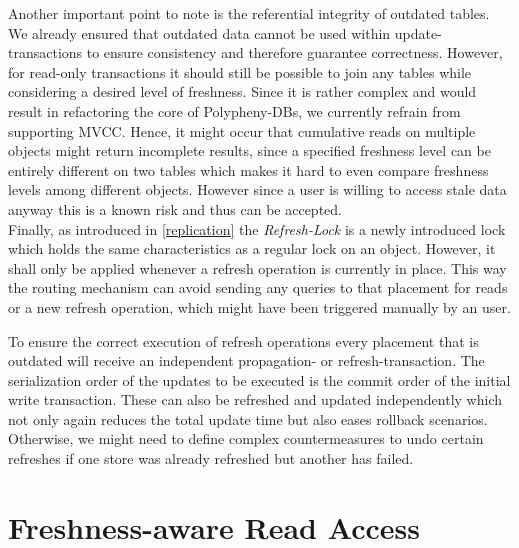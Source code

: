 Another important point to note is the referential integrity of outdated tables. We already ensured that outdated data cannot be used within update-transactions to 
ensure consistency and therefore guarantee correctness. However, for read-only transactions it should still be possible to join any tables while considering 
a desired level of freshness. 
Since it is rather complex and would result in refactoring the core of Polypheny-DBs, we currently refrain from supporting MVCC.
Hence, it might occur that cumulative reads on multiple objects might return incomplete results, since a specified freshness
level can be entirely different on two tables which makes it hard to even compare freshness levels among different objects. However since a user is willing to access 
stale data anyway this is a known risk and thus can be accepted.\\

Finally, as introduced in \ref{replication} the \emph{Refresh-Lock} is a newly introduced lock which holds the same characteristics as a regular lock on an object.
However, it shall only be applied whenever a refresh operation is currently in place. This way the routing mechanism can avoid sending any queries to that placement
for reads or a new refresh operation, which might have been triggered manually by an user.

To ensure the correct execution of refresh operations every placement that is outdated will receive an independent propagation- or refresh-transaction.
The serialization order of the updates to be executed is the commit order of the initial write transaction.
These can also be refreshed and updated independently which not only again reduces the total update time but also eases rollback scenarios.
Otherwise, we might need to define complex countermeasures to undo certain refreshes if one store was already refreshed but another has failed.




\section{Freshness-aware Read Access}

